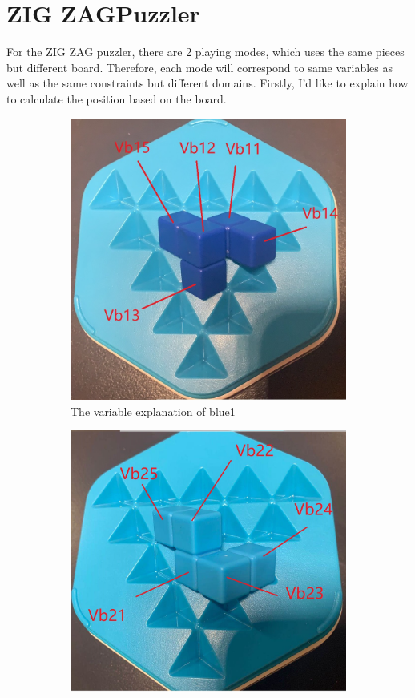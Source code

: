 \section{ZIG ZAGPuzzler}
For the ZIG ZAG puzzler, there are 2 playing modes, which uses the same pieces but different board. Therefore, each mode will correspond to same variables as well as the same constraints but different domains.
Firstly, I'd like to explain how to calculate the position based on the board.
\begin{figure}[htbp]
\begin{subfigure}[b]{.24\textwidth}
\centering
\includegraphics[width=\textwidth]{figs/3Dblue1.jpg}
\caption{The variable explanation of blue1}
  \label{fig:3Dblue1}
\end{subfigure}
\begin{subfigure}[b]{.24\textwidth}
\centering
\includegraphics[width=\textwidth]{figs/3Dblue2.jpg}

\end{subfigure}
\end{figure}
